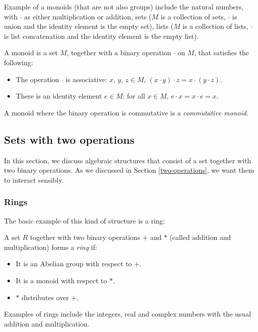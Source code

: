 Example of a monoids (that are not also groups) include the natural numbers, with $\cdot$ as either multiplication or addition, sets ($M$ is a collection of sets, $\cdot$ is union and the identity element is the empty set), lists ($M$ is a collection of lists, $\cdot$ is list concatenation and the identity element is the empty list).

\begin{Definition}
  A monoid is a set $M$, together with a binary operation $\cdot$ on $M$, that satisfies the following:
  \begin{itemize}
  \item The operation $\cdot$ is associative: $x$, $y$, $z \in M$, $(x \cdot y) \cdot z = x \cdot (y \cdot z)$. 
  \item There is an identity element $e \in M$: for all $x \in M$, $e \cdot x = x \cdot e = x$.
  \end{itemize}
A monoid where the binary operation is commutative is a \emph{commutative monoid}.
\end{Definition}



\subsection{Sets with two operations}
In this section, we discuss algebraic structures that consist of a set together with two binary operations. As we discussed in Section \ref{two-operations}, we want them to interact sensibly.
\subsubsection{Rings}
The basic example of this kind of structure is a ring:
\begin{Definition}
A set $R$ together with two binary operations $+$ and $*$ (called addition and multiplication) forms a \emph{ring} if:
\begin{itemize}
\item It is an Abelian group with respect to $+$.
\item It is a monoid with respect to $*$.
\item $*$ distributes over $+$.
\end{itemize}
\end{Definition}
Examples of rings include the integers, real and complex numbers with the usual addition and multiplication.

